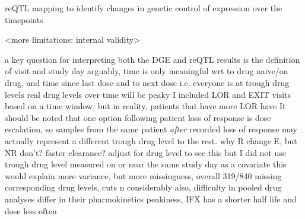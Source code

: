 \begin{outline}


\1 reQTL mapping to identify changes in genetic control of expression over the timepoints

\1 <more limitations: internal validity>

    \2 a key question for interpreting both the DGE and reQTL results is the definition of visit and study day
        \3 arguably, time is only meaningful wrt to drug naive/on drug, and time since last dose and to next dose i.e. everyone is at trough drug levels
        \3 real drug levels over time will be peaky %
        \3 I included LOR and EXIT visits based on a time window, but in reality, patients that have more LOR have 
        \3 It should be noted that one option following patient loss of response is dose escalation, so samples from the same patient \emph{after} recorded loss of response may actually represent a different trough drug level to the rest.
    \2    %
        \3 why R change E, but NR don't? faster clearance? adjust for drug level to see this
        \3 but I did not use trough drug level measured on or near the same study day as a covariate
        \3 this would explain more variance, but
            more missingness, overall 319/840 missing corresponding drug levels, cuts n considerably
        \3 also, difficulty in pooled drug analyses
        \3 differ in their pharmokinetics peakiness, IFX has a shorter half life and dose less often \autocite{lichtenstein2013ComprehensiveReviewAntitumor}


\end{outline}
